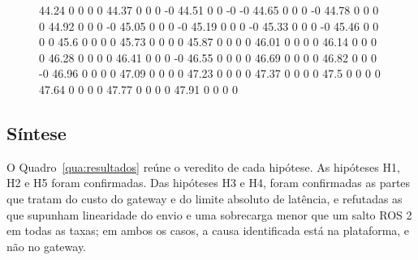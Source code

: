 \documentclass[
    12pt,
    oneside,
    a4paper,
    chapter=TITLE,
    section=TITLE,
    english,
    brazil
]{abntex2}
\begin{document}
\begin{figure}[H]
{        44.24 0 0 0 0
        44.37 0 0 0 -0
        44.51 0 0 -0 -0
        44.65 0 0 0 -0
        44.78 0 0 0 0
        44.92 0 0 0 -0
        45.05 0 0 0 -0
        45.19 0 0 0 -0
        45.33 0 0 0 -0
        45.46 0 0 0 0
        45.6 0 0 0 0
        45.73 0 0 0 0
        45.87 0 0 0 0
        46.01 0 0 0 0
        46.14 0 0 0 0
        46.28 0 0 0 0
        46.41 0 0 0 -0
        46.55 0 0 0 0
        46.69 0 0 0 0
        46.82 0 0 0 -0
        46.96 0 0 0 0
        47.09 0 0 0 0
        47.23 0 0 0 0
        47.37 0 0 0 0
        47.5 0 0 0 0
        47.64 0 0 0 0
        47.77 0 0 0 0
        47.91 0 0 0 0
}\hfivedata
{}
\end{figure}

\subsection{Síntese}
O Quadro~\ref{qua:resultados} reúne o veredito de cada hipótese. As
hipóteses H1, H2 e H5 foram confirmadas. Das hipóteses H3 e H4, foram
confirmadas as partes que tratam do custo do gateway e do limite absoluto
de latência, e refutadas as que supunham linearidade do envio e uma
sobrecarga menor que um salto ROS 2 em todas as taxas; em ambos os casos,
a causa identificada está na plataforma, e não no gateway.
\end{document}
